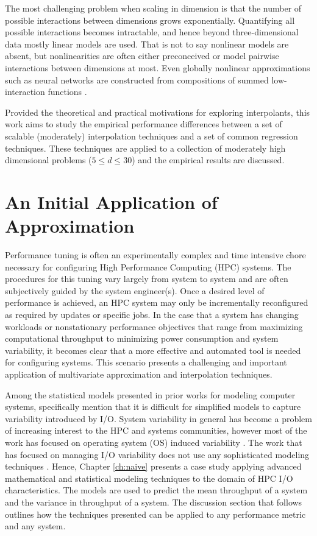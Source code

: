 The most challenging problem when scaling in dimension is that the
number of possible interactions between dimensions grows
exponentially. Quantifying all possible interactions becomes
intractable, and hence beyond three-dimensional data mostly linear
models are used. That is not to say nonlinear models are absent, but
nonlinearities are often either preconceived or model pairwise
interactions between dimensions at most. Even globally nonlinear
approximations such as neural networks are constructed from
compositions of summed low-interaction functions
\cite{clevert2015fast}.

Provided the theoretical and practical motivations for exploring
interpolants, this work aims to study the empirical performance
differences between a set of scalable (moderately) interpolation
techniques and a set of common regression techniques. These techniques
are applied to a collection of moderately high dimensional problems
($5 \le d \le 30$) and the empirical results are discussed.

\section{An Initial Application of Approximation}

Performance tuning is often an experimentally complex and time
intensive chore necessary for configuring High Performance Computing
(HPC) systems. The procedures for this tuning vary largely from system
to system and are often subjectively guided by the system
engineer(s). Once a desired level of performance is achieved, an HPC
system may only be incrementally reconfigured as required by updates
or specific jobs. In the case that a system has changing workloads or
nonstationary performance objectives that range from maximizing
computational throughput to minimizing power consumption and system
variability, it becomes clear that a more effective and automated tool
is needed for configuring systems. This scenario presents a
challenging and important application of multivariate approximation
and interpolation techniques.

Among the statistical models presented in prior works for modeling computer systems,
\cite{bailey2005performance} specifically mention that it is difficult
for simplified models to capture variability introduced by
I/O. System variability in general has become a problem of increasing
interest to the HPC and systems communities, however most of the work
has focused on operating system (OS) induced variability
\cite{beckman2008benchmarking,de2007identifying}. The work that has
focused on managing I/O variability does not use any sophisticated
modeling techniques \cite{lofstead2010managing}. Hence, Chapter
\ref{ch:naive} presents a case study applying advanced mathematical
and statistical modeling techniques to the domain of HPC I/O
characteristics. The models are used to predict the mean throughput of
a system and the variance in throughput of a system. The discussion
section that follows outlines how the techniques presented can be
applied to any performance metric and any system.

